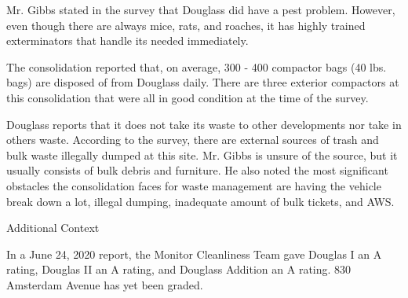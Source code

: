 Mr. Gibbs stated in the survey that Douglass did have a pest problem. However, even though there are always mice, rats, and roaches, it has highly trained exterminators that handle its needed immediately.



The consolidation reported that, on average,  300  - 400 compactor bags (40 lbs. bags) are disposed of from Douglass daily. There are three exterior compactors at this consolidation that were all in good condition at the time of the survey. 



Douglass reports that it does not take its waste to other developments nor take in others waste. According to the survey, there are external sources of trash and bulk waste illegally dumped at this site.  Mr. Gibbs is unsure of the source, but it usually consists of bulk debris and furniture. He also noted the most significant obstacles the consolidation faces for waste management are having the vehicle break down a lot, illegal dumping, inadequate amount of bulk tickets, and AWS.  



Additional Context 



In a June 24, 2020 report, the Monitor Cleanliness Team gave Douglas I an A rating, Douglas II an A rating, and Douglass Addition an A rating. 830 Amsterdam Avenue has yet been graded.